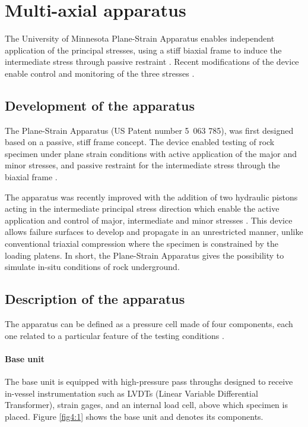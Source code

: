 \section{Multi-axial apparatus}

The University of Minnesota Plane-Strain Apparatus enables independent application of the principal stresses, using a stiff biaxial frame to induce the intermediate stress through passive restraint \cite{Labuz1996}. Recent modifications of the device enable control and monitoring of the three stresses \cite{Zeng2019}.

\subsection{Development of the apparatus}

The Plane-Strain Apparatus (US Patent number 5 063 785), was first designed based on a passive, stiff frame concept. The device enabled testing of rock specimen under plane strain conditions with active application of the major and minor stresses, and passive restraint for the intermediate stress through the biaxial frame \cite{Labuz1996}. 

The apparatus was recently improved with the addition of two hydraulic pistons acting in the intermediate principal stress direction which enable the active application and control of major, intermediate and minor stresses \cite{Zeng2019}. This device allows failure surfaces to develop and propagate in an unrestricted manner, unlike conventional triaxial compression where the specimen is constrained by the loading platens. In short, the Plane-Strain Apparatus gives the possibility to simulate in-situ conditions of rock underground. 

\subsection{Description of the apparatus}

The apparatus can be defined as a pressure cell made of four components, each one related to a particular feature of the testing conditions \cite{Labuz1996,Zeng2019}. 

\paragraph{Base unit} 
The base unit is equipped with high-pressure pass throughs designed to receive in-vessel instrumentation such as LVDTs (Linear Variable Differential Transformer), strain gages, and an internal load cell, above which specimen is placed. Figure \ref{fig4:1} shows the base unit and denotes its components. 

